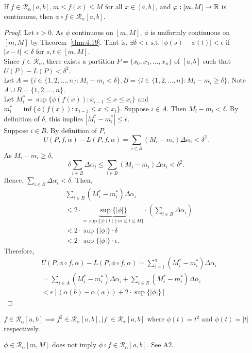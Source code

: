 \begin{thm}[11]
	If $f \in \mathscr{R}_{\alpha}[a,b], m \le f(x)\le M$ for all $x \in [a,b]$, and $\varphi:[m,M]\to \mathbb{R}$ is continuous, then $\phi \circ f \in \mathscr{R}_{\alpha}[a,b]$.
	\begin{proof}
		Let $\epsilon>0$. As $\phi$ continuous on $[m,M]$, $\phi$ is uniformly continuous on $[m,M]$ by Theorem~\ref{thm:4.19}.
		That is, $\exists{\delta < \epsilon} \text{ s.t. } |\phi(s)-\phi(t)|<\epsilon$ if $|s-t|<\delta$ for $s,t \in [m,M]$.\\
		Since $f \in \mathscr{R}_{\alpha}$, there exists a partition $P=\{x_0,x_1,\ldots ,x_n\}$ of $[a,b]$ such that $U(P)-L(P)<\delta^2$.\\
		Let $A=\{i \in \{1,2,\ldots ,n\}: M_i -m_i < \delta\}, B=\{i \in \{1,2,\ldots ,n\}: M_i -m_i \ge  \delta\}$.
		Note $A \cup B=\{1,2,\ldots ,n\}$.
		\\
		Let $M^{*}_i=\sup\{\phi(f(x)):x_{i-1}\le x\le x_i\}$ and $m^{*}_i=\inf\{\phi(f(x)):x_{i-1}\le x\le x_i\}$.
		Suppose $i \in A$. Then $M_i-m_i<\delta$. By definition of $\delta$, this implies $|M^{*}_i-m^{*}_i|\le \epsilon$.\\
		Suppose $i \in B$.
		By definition of $P$,
		\[
			U(P,f,\alpha)-L(P,f,\alpha)=\sum_{i \in B}{(M_i-m_i)\Delta \alpha_i}<\delta ^2.
		\]
		As $M_i-m_i\ge \delta$,
		\[
			\delta \sum_{i \in B}{\Delta \alpha_i}\le \sum_{i \in B}{(M_i-m_i)\Delta \alpha_i}<\delta ^2
			.\]
		Hence, $\sum_{i \in B}{\Delta \alpha_i}<\delta$. Then,
		\begin{align*}
			 & \sum_{i \in B}{(M^{*}_i-m^{*}_i)\Delta \alpha_i}                                                                            \\
			 & \le 2 \cdot \underbrace{\sup\{|\phi|\}}_{=\sup\{|\phi(t)|: m\le t\le M\}} \cdot \left(\sum_{i \in B}{\Delta\alpha_i}\right) \\
			 & < 2\cdot \sup\{|\phi|\} \cdot \delta                                                                                        \\
			 & <2 \cdot \sup\{|\phi|\} \cdot \epsilon.
		\end{align*}
		Therefore,
		\begin{align*}
			 & U(P,\phi \circ f,\alpha)-L(P,\phi \circ f,\alpha)=\sum_{i=1}^{n}{(M^{*}_i-m^{*}_i)\Delta \alpha_i} \\
			 & =\sum_{i \in A}{(M^{*}_i-m^{*}_i)\Delta \alpha_i}+\sum_{i \in B}{(M^{*}_i-m^{*}_i)\Delta \alpha_i} \\
			 & < \epsilon[(\alpha(b)-\alpha(a)) + 2 \cdot \sup\{|\phi|\}]
		\end{align*}

	\end{proof}
	\begin{example}
		$f \in \mathscr{R}_{\alpha}[a,b]\implies f^2 \in \mathscr{R}_{\alpha}[a,b], |f| \in \mathscr{R}_{\alpha}[a,b]$ where $\phi(t)=t^2$ and $\phi(t)=|t|$ respectively.
	\end{example}
	\begin{note}
		$\phi \in \mathscr{R}_{\alpha}[m,M]$ does not imply $\phi \circ f \in \mathscr{R}_{\alpha}[a,b]$. See A2.
	\end{note}
\end{thm}

